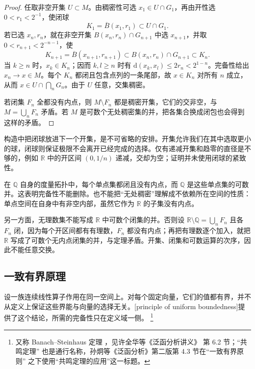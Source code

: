 \begin{proof}
任取非空开集 \(U\subset M\)。由稠密性可选 \(x_1\in U\cap G_1\)，再由开性选 \(0<r_1<2^{-1}\)，使闭球
\[
 K_1=\overline B(x_1,r_1)\subset U\cap G_1.
\]
若已选 \(x_n,r_n\)，就在非空开集 \(B(x_n,r_n)\cap G_{n+1}\) 中选 \(x_{n+1}\)，并取 \(0<r_{n+1}<2^{-n-1}\)，使
\[
 K_{n+1}=\overline B(x_{n+1},r_{n+1})
 \subset B(x_n,r_n)\cap G_{n+1}\subset K_n.
\]
当 \(k\ge n\) 时，\(x_k\in K_n\)；因而 \(k,l\ge n\) 时有 \(\mathrm{d}(x_k,x_l)\le 2r_n<2^{1-n}\)。完备性给出 \(x_n\to x\in M\)。每个 \(K_n\) 都闭且包含点列的一条尾部，故 \(x\in K_n\) 对所有 \(n\) 成立，从而 \(x\in U\cap\bigcap_nG_n\)。由于 \(U\) 任意，交集稠密。

若闭集 \(F_n\) 全都没有内点，则 \(M\setminus F_n\) 都是稠密开集，它们的交非空，与 \(M=\bigcup_nF_n\) 矛盾。若 \(M\) 是可数个无处稠密集的并，把各集合换成闭包也会得到这样的矛盾。
\end{proof}

构造中把闭球放进下一个开集，是不可省略的安排。开集允许我们在其中选取更小的球，闭球则保证极限不会离开已经完成的选择。仅有递减开集和趋零的直径是不够的，例如 \(\mathbb R\) 中的开区间 \((0,1/n)\) 递减，交却为空；证明并未使用闭球的紧致性。

\ProseParagraphBreak

在 \(\mathbb Q\) 自身的度量拓扑中，每个单点集都闭且没有内点，而 \(\mathbb Q\) 是这些单点集的可数并。这表明完备性不能删除。也不能把“无处稠密”理解成不依赖所在空间的性质：单点空间在自身中有非空内部，虽然它作为 \(\mathbb R\) 的子集没有内点。

\ProseParagraphBreak

另一方面，无理数集不能写成 \(\mathbb R\) 中可数个闭集的并。否则设 \(\mathbb R\setminus\mathbb Q=\bigcup_nF_n\) 且各 \(F_n\) 闭，因为每个开区间都有有理数，\(F_n\) 都没有内点；再把有理数逐个加入，就把 \(\mathbb R\) 写成了可数个无内点闭集的并，与定理矛盾。开集、闭集和可数运算的次序，因此不能任意交换。

\subsection{一致有界原理}
\label{b1:subsec:080302}

设一族连续线性算子作用在同一空间上。对每个固定向量，它们的值都有界，并不从定义上保证这些界能与向量的选择无关。[principle of uniform boundedness]提供了这个结论，所需的完备性只在定义域一侧。%
\footnote{又称 Banach--Steinhaus 定理%
，见许全华等《泛函分析讲义》%
\cite{Xu2017Fanhan}第 6.2 节；“共鸣定理”%
也是通行名称，孙炯等《泛函分析》第二版\cite{Sun2018Fanhan}第 4.3 节在“一致有界原则”
之下使用“共鸣定理的应用”这一标题。}

